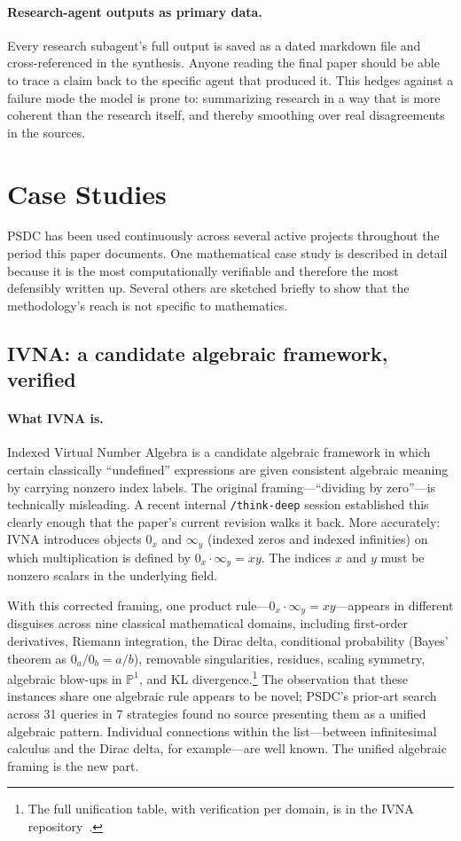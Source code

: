 \documentclass[12pt]{article}
\begin{document}
\paragraph{Research-agent outputs as primary data.} Every research subagent's full output is saved as a dated markdown file and cross-referenced in the synthesis. Anyone reading the final paper should be able to trace a claim back to the specific agent that produced it. This hedges against a failure mode the model is prone to: summarizing research in a way that is more coherent than the research itself, and thereby smoothing over real disagreements in the sources.

\section{Case Studies}
\label{sec:cases}

PSDC has been used continuously across several active projects throughout the period this paper documents. One mathematical case study is described in detail because it is the most computationally verifiable and therefore the most defensibly written up. Several others are sketched briefly to show that the methodology's reach is not specific to mathematics.

\subsection{IVNA: a candidate algebraic framework, verified}
\label{subsec:ivna}

\paragraph{What IVNA is.} Indexed Virtual Number Algebra is a candidate algebraic framework in which certain classically ``undefined'' expressions are given consistent algebraic meaning by carrying nonzero index labels. The original framing---``dividing by zero''---is technically misleading. A recent internal \texttt{/think-deep} session established this clearly enough that the paper's current revision walks it back. More accurately: IVNA introduces objects $0_x$ and $\infty_y$ (indexed zeros and indexed infinities) on which multiplication is defined by $0_x \cdot \infty_y = xy$. The indices $x$ and $y$ must be nonzero scalars in the underlying field.

With this corrected framing, one product rule---$0_x \cdot \infty_y = xy$---appears in different disguises across nine classical mathematical domains, including first-order derivatives, Riemann integration, the Dirac delta, conditional probability (Bayes' theorem as $0_a / 0_b = a/b$), removable singularities, residues, scaling symmetry, algebraic blow-ups in $\mathbb{P}^1$, and KL divergence.\footnote{The full unification table, with verification per domain, is in the IVNA repository~\cite{ivnarepo}.} The observation that these instances share one algebraic rule appears to be novel; PSDC's prior-art search across 31 queries in 7 strategies found no source presenting them as a unified algebraic pattern. Individual connections within the list---between infinitesimal calculus and the Dirac delta, for example---are well known. The unified algebraic framing is the new part.
\end{document}
